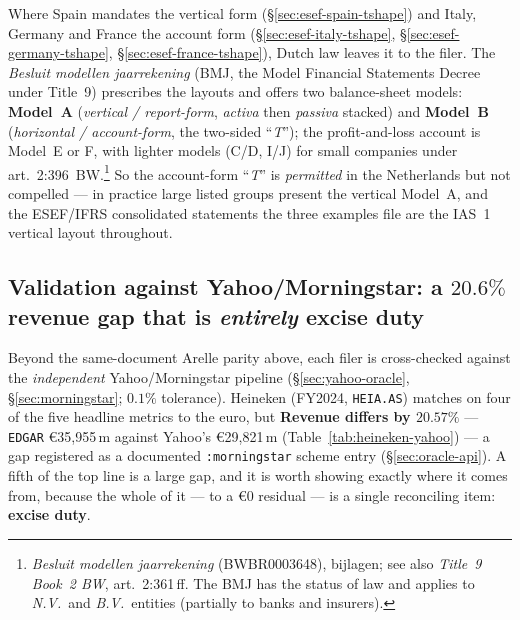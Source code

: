 \documentclass[11pt,a4paper]{report}
\begin{document}
Where Spain mandates the vertical form (\S\ref{sec:esef-spain-tshape}) and Italy, Germany and France the
account form (\S\ref{sec:esef-italy-tshape}, \S\ref{sec:esef-germany-tshape}, \S\ref{sec:esef-france-tshape}),
Dutch law leaves it to the filer. The \emph{Besluit modellen jaarrekening}
(BMJ, the Model Financial Statements Decree under Title~9) prescribes the layouts and offers two balance-sheet
models: \textbf{Model~A} (\emph{vertical / report-form}, \emph{activa} then \emph{passiva} stacked) and
\textbf{Model~B} (\emph{horizontal / account-form}, the two-sided ``\emph{T}''); the profit-and-loss account
is Model~E or F, with lighter models (C/D, I/J) for small companies under art.~2:396~BW.\footnote{\emph{Besluit
modellen jaarrekening} (BWBR0003648), bijlagen; see also \emph{Title~9 Book~2 BW}, art.~2:361\,ff. The BMJ has
the status of law and applies to \emph{N.V.}\ and \emph{B.V.}\ entities (partially to banks and insurers).}
So the account-form ``\emph{T}'' is \emph{permitted} in the Netherlands but not compelled --- in practice large
listed groups present the vertical Model~A, and the ESEF/IFRS consolidated statements the three examples file
are the IAS~1 vertical layout throughout.

\subsection{Validation against Yahoo/Morningstar: a $20.6\%$ revenue gap that is \emph{entirely} excise duty}
\label{sec:esef-nl-yahoo}

Beyond the same-document Arelle parity above, each filer is cross-checked against the \emph{independent}
Yahoo/Morningstar pipeline (\S\ref{sec:yahoo-oracle}, \S\ref{sec:morningstar}; \(0.1\%\) tolerance). Heineken
(FY2024, \texttt{HEIA.AS}) matches on four of the five headline metrics to the euro, but \textbf{Revenue differs
by $20.57\%$} --- \texttt{EDGAR} €35{,}955\,m against Yahoo's €29{,}821\,m (Table~\ref{tab:heineken-yahoo})
--- a gap registered as a documented \texttt{:morningstar} scheme entry (\S\ref{sec:oracle-api}).
A fifth of the top line is a large gap, and it is worth showing exactly where it comes from, because the whole
of it --- to a €0 residual --- is a single reconciling item: \textbf{excise duty}.
\end{document}
